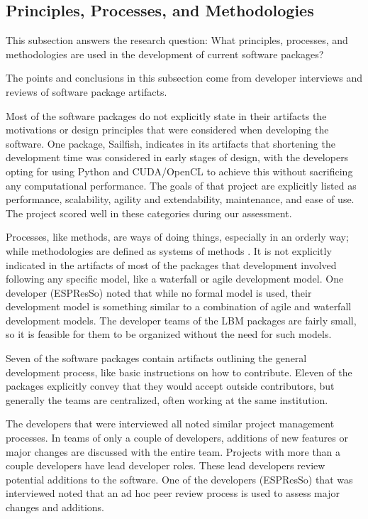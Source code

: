 \documentclass[final, 3p, times, authoryear]{elsarticle}
\begin{document}
\subsection{Principles, Processes, and Methodologies} \label{prinprocmeth}

This subsection answers the research question: What principles, processes, and
methodologies are used in the development of current software packages?

The points and conclusions in this subsection come from developer interviews and
reviews of software package artifacts.

Most of the software packages do not explicitly state in their artifacts the
motivations or design principles that were considered when developing the
software. One package, Sailfish, indicates in its artifacts that shortening the
development time was considered in early stages of design, with the developers
opting for using Python and CUDA/OpenCL to achieve this without sacrificing any
computational performance. The goals of that project are explicitly listed as
performance, scalability, agility and extendability, maintenance, and ease of
use. The project scored well in these categories during our assessment.

Processes, like methods, are ways of doing things, especially in an orderly way;
while methodologies are defined as systems of methods
\citep{ghezzi1991fundamentals}. It is not explicitly indicated in the artifacts
of most of the packages that development involved following any specific model,
like a waterfall or agile development model. One developer (ESPResSo) noted that
while no formal model is used, their development model is something similar to a
combination of agile and waterfall development models. The developer teams of
the LBM packages are fairly small, so it is feasible for them to be organized
without the need for such models. 

Seven of the software packages contain artifacts outlining the general
development process, like basic instructions on how to contribute. Eleven of the
packages explicitly convey that they would accept outside contributors, but
generally the teams are centralized, often working at the same institution. 

The developers that were interviewed all noted similar project management
processes. In teams of only a couple of developers, additions of new features or
major changes are discussed with the entire team. Projects with more than a
couple developers have lead developer roles. These lead developers review
potential additions to the software. One of the developers (ESPResSo) that was
interviewed noted that an ad hoc peer review process is used to assess major
changes and additions.
\end{document}

